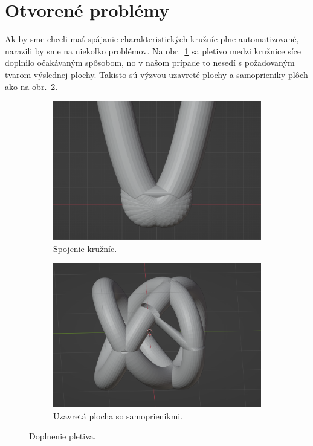\section{Otvorené problémy}
Ak by sme chceli mať spájanie charakteristických kružníc plne automatizované, 
narazili by sme na niekoľko problémov. Na obr.~\ref{fig:spojenie_kruznic_1} sa pletivo medzi kružnice síce doplnilo očakávaným spôsobom, no v našom prípade to nesedí s požadovaným tvarom výslednej plochy.
Takisto sú výzvou uzavreté plochy a samoprieniky plôch ako na obr.~\ref{fig:spojenie_kruznic_2}.

\begin{figure}[h]
    \centering
    \begin{subfigure}[b]{0.6\textwidth}
        \centering
        \includegraphics[width=\textwidth]{images/mesh.png}
		\caption[Spojenie kružníc.]{Spojenie kružníc.}
        \label{fig:spojenie_kruznic_1}
    \end{subfigure}
    \hfill
    \begin{subfigure}[b]{0.6\textwidth}
        \centering
        \includegraphics[width=\textwidth]{images/diery.png}
        	\caption[Uzavretá plocha so samoprienikmi.]{Uzavretá plocha so samoprienikmi.}
        \label{fig:spojenie_kruznic_2}
    \end{subfigure}
    	\caption[Doplnenie pletiva.]{Doplnenie pletiva.}
    \label{fig:spojenie_kruznic}
\end{figure}

